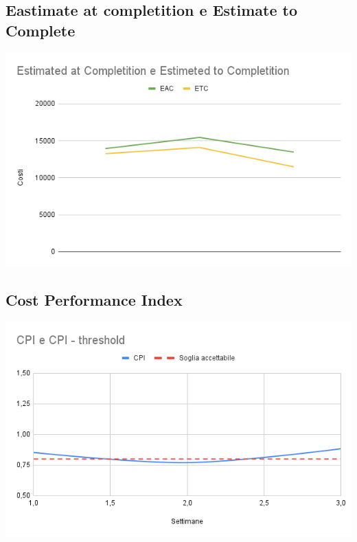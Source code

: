 \documentclass[12pt]{article}
\begin{document}
\subsection{Eastimate at completition e Estimate to Complete}
\begin{center}
	\includegraphics[scale=0.6]{EAC_ETC.png}
\end{center}
\subsection{Cost Performance Index}
\begin{center}
	\includegraphics[scale=0.6]{CPI.png}
\end{center}
\end{document}

